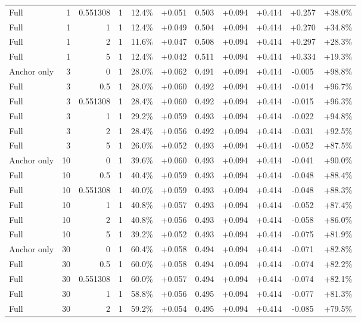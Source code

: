 \begin{table}[htbp]
\begin{tabular}{lrrrccccccc}
Full & 1 & 0.551308 & 1 & 12.4\% & +0.051 & 0.503 & +0.094 & +0.414 & +0.257 & +38.0\% \\
Full & 1 & 1 & 1 & 12.4\% & +0.049 & 0.504 & +0.094 & +0.414 & +0.270 & +34.8\% \\
Full & 1 & 2 & 1 & 11.6\% & +0.047 & 0.508 & +0.094 & +0.414 & +0.297 & +28.3\% \\
Full & 1 & 5 & 1 & 12.4\% & +0.042 & 0.511 & +0.094 & +0.414 & +0.334 & +19.3\% \\
Anchor only & 3 & 0 & 1 & 28.0\% & +0.062 & 0.491 & +0.094 & +0.414 & -0.005 & +98.8\% \\
Full & 3 & 0.5 & 1 & 28.0\% & +0.060 & 0.492 & +0.094 & +0.414 & -0.014 & +96.7\% \\
Full & 3 & 0.551308 & 1 & 28.4\% & +0.060 & 0.492 & +0.094 & +0.414 & -0.015 & +96.3\% \\
Full & 3 & 1 & 1 & 29.2\% & +0.059 & 0.493 & +0.094 & +0.414 & -0.022 & +94.8\% \\
Full & 3 & 2 & 1 & 28.4\% & +0.056 & 0.492 & +0.094 & +0.414 & -0.031 & +92.5\% \\
Full & 3 & 5 & 1 & 26.0\% & +0.052 & 0.493 & +0.094 & +0.414 & -0.052 & +87.5\% \\
Anchor only & 10 & 0 & 1 & 39.6\% & +0.060 & 0.493 & +0.094 & +0.414 & -0.041 & +90.0\% \\
Full & 10 & 0.5 & 1 & 40.4\% & +0.059 & 0.493 & +0.094 & +0.414 & -0.048 & +88.4\% \\
Full & 10 & 0.551308 & 1 & 40.0\% & +0.059 & 0.493 & +0.094 & +0.414 & -0.048 & +88.3\% \\
Full & 10 & 1 & 1 & 40.8\% & +0.057 & 0.493 & +0.094 & +0.414 & -0.052 & +87.4\% \\
Full & 10 & 2 & 1 & 40.8\% & +0.056 & 0.493 & +0.094 & +0.414 & -0.058 & +86.0\% \\
Full & 10 & 5 & 1 & 39.2\% & +0.052 & 0.493 & +0.094 & +0.414 & -0.075 & +81.9\% \\
Anchor only & 30 & 0 & 1 & 60.4\% & +0.058 & 0.494 & +0.094 & +0.414 & -0.071 & +82.8\% \\
Full & 30 & 0.5 & 1 & 60.0\% & +0.058 & 0.494 & +0.094 & +0.414 & -0.074 & +82.2\% \\
Full & 30 & 0.551308 & 1 & 60.0\% & +0.057 & 0.494 & +0.094 & +0.414 & -0.074 & +82.1\% \\
Full & 30 & 1 & 1 & 58.8\% & +0.056 & 0.495 & +0.094 & +0.414 & -0.077 & +81.3\% \\
Full & 30 & 2 & 1 & 59.2\% & +0.054 & 0.495 & +0.094 & +0.414 & -0.085 & +79.5\% \\

\end{tabular}
\end{table}
